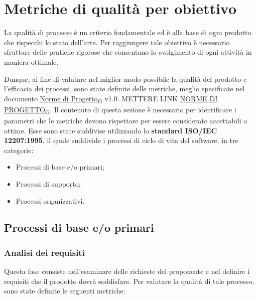 \section{Metriche di qualità per obiettivo}
La qualità di processo è un criterio fondamentale ed è alla base di ogni prodotto
che rispecchi lo stato dell'arte. Per raggiungere tale obiettivo è necessario
sfruttare delle pratiche rigorose che consentano lo svolgimento di ogni attività
in maniera ottimale.

Dunque, al fine di valutare nel miglior modo possibile la qualità del prodotto e l'efficacia dei processi, sono state definite delle metriche, meglio specificate nel documento \href{https://7last.github.io/docs/rtb/documentazione-interna/glossario#norme-di-progetto}{Norme di Progetto\textsubscript{G}} v1.0. METTERE LINK \href{https://7last.github.io/docs/rtb/documentazione-interna/glossario#norme-di-progetto}{NORME DI PROGETTO\textsubscript{G}}. Il contenuto di
questa sezione è necessario per identificare i parametri che le metriche devono rispettare per essere considerate accettabili o ottime.
Esse sono state suddivise utilizzando lo \textbf{standard ISO/IEC 12207:1995}, il quale suddivide i processi di ciclo di vita del software, in tre categorie:
\begin{itemize}
	\item Processi di base e/o primari;
	\item Processi di supporto;
	\item Processi organizzativi.
\end{itemize}

\subsection{Processi di base e/o primari}
\subsubsection{Analisi dei requisiti}
Questa fase consiste nell'esaminare delle richieste del proponente e nel definire i requisiti che il prodotto dovrà soddisfare. Per valutare la qualità di tale processo, sono state definite le seguenti metriche:



